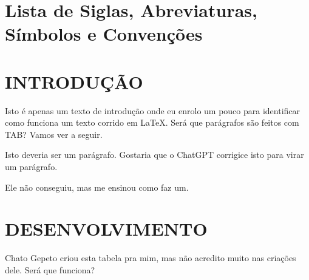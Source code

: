 \documentclass{article}
\renewcommand{\headrulewidth}{0pt} %
\renewcommand{\footrulewidth}{0pt} %
\begin{document}
\listoffigures
\newpage

\listoftables
\newpage

\section*{Lista de Siglas, Abreviaturas, Símbolos e Convenções}

\clearpage
{} %
\setcounter{page}{1}
\setcounter{section}{0} %

\pagestyle{fancy}
\renewcommand{\headrulewidth}{0pt} %
\renewcommand{\footrulewidth}{0pt} %


\section{INTRODUÇÃO}
Isto é apenas um texto de introdução onde eu enrolo um pouco para identificar como funciona um texto corrido em LaTeX. Será que parágrafos são feitos com TAB? Vamos ver a seguir.

Isto deveria ser um parágrafo. Gostaria que o ChatGPT corrigice isto para virar um parágrafo.

Ele não conseguiu, mas me ensinou como faz um.

\newpage

\section{DESENVOLVIMENTO}
Chato Gepeto criou esta tabela pra mim, mas não acredito muito nas criações dele. Será  que funciona?
\end{document}
